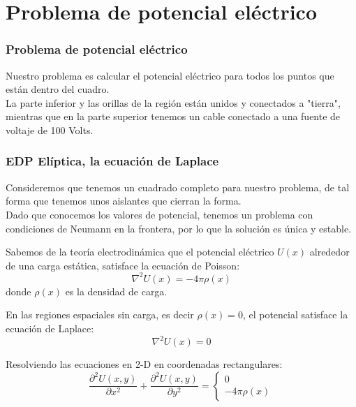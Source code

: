 \section{Problema de potencial eléctrico}
\begin{frame}
\fontsize{14}{14}\selectfont
\frametitle{Problema de potencial eléctrico}
Nuestro problema es calcular el potencial eléctrico para todos los puntos que están dentro del cuadro.
\\
\medskip
La parte inferior y las orillas de la región están unidos y conectados a "tierra", mientras que en la parte superior tenemos un cable conectado a una fuente de voltaje de 100 Volts.
\begin{center}
\end{center}
\end{frame}
\begin{frame}
\frametitle{EDP Elíptica, la ecuación de Laplace}
Consideremos que tenemos un cuadrado completo para nuestro problema, de tal forma que tenemos unos aislantes que cierran la forma.
\\
\medskip
Dado que conocemos los valores de potencial, tenemos un problema con condiciones de Neumann en la frontera, por lo que la solución es única y estable.
\end{frame}
\begin{frame}
Sabemos de la teoría electrodinámica que el potencial eléctrico $U(x)$ alrededor de una carga estática, satisface la ecuación de Poisson:
\[ \nabla^{2} U(x) = - 4 \pi \rho(x) \]
donde $\rho(x)$ es la densidad de carga.
\end{frame}
\begin{frame}
En las regiones espaciales sin carga, es decir $\rho(x)=0$, el potencial satisface la ecuación de Laplace:
\[ \nabla^{2} U(x) = 0\]
\end{frame}
\begin{frame}
Resolviendo las ecuaciones en 2-D en coordenadas rectangulares:
\[ \dfrac{\partial^{2} U(x,y)}{\partial x^{2}} + \dfrac{\partial^{2} U(x,y)}{\partial y^{2}}  = \left\lbrace \begin{array}{l}
0 \\
- 4\pi \rho(x)
\end{array} \right. \]
\end{frame}
